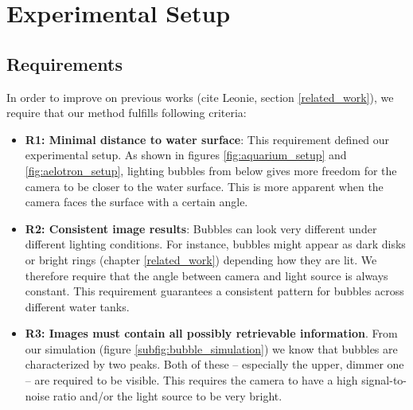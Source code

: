 \chapter{Experimental Setup}\label{experimental_setup}
	\section{Requirements}\label{requirements}
		In order to improve on previous works (cite Leonie, section \ref{related_work}), we require that our method fulfills following criteria:
	\begin{itemize}
		\item \textbf{R1: Minimal distance to water surface}: This requirement defined our experimental setup. As shown in figures \ref{fig:aquarium_setup} and \ref{fig:aelotron_setup}, lighting bubbles from below gives more freedom for the camera to be closer to the water surface. This is more apparent when the camera faces the surface with a certain angle. 
		\item \textbf{R2: Consistent image results}: Bubbles can look very different under different lighting conditions. For instance, bubbles might appear as dark disks or bright rings (chapter \ref{related_work}) depending how they are lit. We therefore require that the angle between camera and light source is always constant. This requirement guarantees a consistent pattern for bubbles across different water tanks.
		\item \textbf{R3: Images must contain all possibly retrievable information}. From our simulation (figure \ref{subfig:bubble_simulation}) we know that bubbles are characterized by two peaks. Both of these – especially the upper, dimmer one – are required to be visible. This requires the camera to have a high signal-to-noise ratio and/or the light source to be very bright. 
	\end{itemize}	
		
